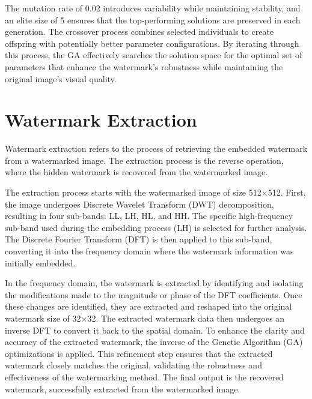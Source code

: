 The mutation rate of 0.02 introduces variability while maintaining stability, and an elite size of 5 ensures that the top-performing solutions are preserved in each generation. The crossover process combines selected individuals to create offspring with potentially better parameter configurations. By iterating through this process, the GA effectively searches the solution space for the optimal set of parameters that enhance the watermark's robustness while maintaining the original image's visual quality.

\section{Watermark Extraction}

Watermark extraction refers to the process of retrieving the embedded watermark from a watermarked image. The extraction process is the reverse operation, where the hidden watermark is recovered from the watermarked image.

The extraction process starts with the watermarked image of size 512$\times$512. First, the image undergoes Discrete Wavelet Transform (DWT) decomposition, resulting in four sub-bands: LL, LH, HL, and HH. The specific high-frequency sub-band used during the embedding process (LH) is selected for further analysis. The Discrete Fourier Transform (DFT) is then applied to this sub-band, converting it into the frequency domain where the watermark information was initially embedded. 

In the frequency domain, the watermark is extracted by identifying and isolating the modifications made to the magnitude or phase of the DFT coefficients. Once these changes are identified, they are extracted and reshaped into the original watermark size of 32$\times$32. The extracted watermark data then undergoes an inverse DFT to convert it back to the spatial domain. To enhance the clarity and accuracy of the extracted watermark, the inverse of the Genetic Algorithm (GA) optimizations is applied. This refinement step ensures that the extracted watermark closely matches the original, validating the robustness and effectiveness of the watermarking method. The final output is the recovered watermark, successfully extracted from the watermarked image.
